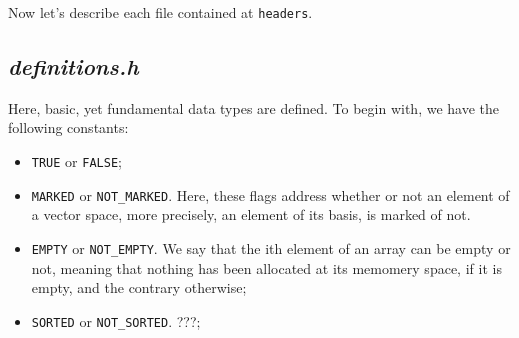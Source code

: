 \documentclass[11pt,a4paper]{article}
\begin{document}
Now let's describe each file contained at \texttt{headers}.

\subsection{\textit{definitions.h}}
Here, basic, yet fundamental data types are defined. To begin with, 
we have the following constants:
\begin{itemize}
	\item  \texttt{TRUE} or \texttt{FALSE};

	\item  \texttt{MARKED} or \texttt{NOT\_MARKED}. Here, these flags address whether or not
		an element of a vector space, more precisely, an element of its basis, is marked of not.

	\item \texttt{EMPTY} or \texttt{NOT\_EMPTY}. We say that the ith element of an array can be empty
		or not, meaning that nothing has been allocated at its memomery space, if it is
		empty, and the contrary otherwise;

	\item \texttt{SORTED} or \texttt{NOT\_SORTED}. ???;
\end{itemize}

\end{document}
